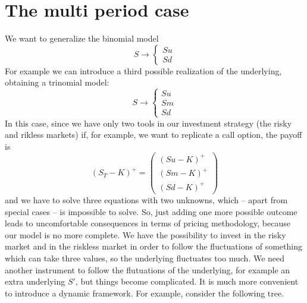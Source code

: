 \section{The multi period case}
We want to generalize the binomial model
\begin{equation*}
    S\to\begin{cases}
    Su \\ Sd
    \end{cases}
\end{equation*}
For example we can introduce a third possible realization of the underlying, obtaining a trinomial model:
\begin{equation*}
    S\to\begin{cases}
    Su \\ Sm \\ Sd
    \end{cases}
\end{equation*}
In this case, since we have only two tools in our investment strategy (the risky and rikless markets) if, for example, we want to replicate a call option, the payoff is
\begin{equation*}
    (S_T-K)^+ = \left(\begin{matrix}
        (Su-K)^+ \\ (Sm-K)^+ \\ (Sd-K)^+
    \end{matrix}\right)
\end{equation*}
and we have to solve three equations with two unknowns, which -- apart from special cases -- is impossible to solve. So, just adding one more possible outcome leads to uncomfortable consequences in terms of pricing methodology, because our model is no more complete. We have the possibility to invest in the risky market and in the riskless market in order to follow the fluctuations of something which can take three values, so the underlying fluctuates too much. We need another instrument to follow the flutuations of the underlying, for example an extra underlying $S'$, but things become complicated. It is much more convenient to introduce a dynamic framework. For example, consider the following tree.
\begin{center}
\end{center}

